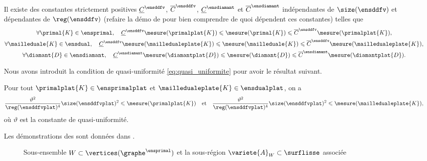 \begin{lemme} \label{prop:estimations_tailles_plat_vs_courbe}
Il existe des constantes strictement positives $\underline{C}^\ensddfv$, $\overline{C}^\ensddfv$, $\underline{C}^\ensdiamant$ et $\overline{C}^\ensdiamant$ indépendantes de $\size(\ensddfv)$ et dépendantes de $\reg(\ensddfv)$ (refaire la démo de \cite{dziuk_finite_2013} pour bien comprendre de quoi dépendent ces constantes) telles que
\begin{gather}
\forall \primal{K} \in \ensprimal,
\quad
\underline{C}^\ensddfv \mesure(\primalplat{K}) \leqslant \mesure(\primal{K}) \leqslant \overline{C}^\ensddfv \mesure(\primalplat{K}), \label{eq:estimations_tailles_plat_vs_courbe_primal} \\
\forall \mailleduale{K} \in \ensdual,
\quad
\underline{C}^\ensddfv \mesure(\mailledualeplate{K}) \leqslant \mesure(\mailleduale{K}) \leqslant \overline{C}^\ensddfv \mesure(\mailledualeplate{K}), \\
\forall \diamant{D} \in \ensdiamant,
\quad
\underline{C}^\ensdiamant \mesure(\diamantplat{D}) \leqslant \mesure(\diamant{D}) \leqslant \overline{C}^\ensdiamant \mesure(\diamantplat{D}).
\end{gather}
\end{lemme}
Nous avons introduit la condition de quasi-uniformité \ref{eq:quasi_uniformite} pour avoir le résultat suivant. 
\begin{lemme} \label{prop:mino_mesure_primal_K}
Pour tout $\primalplat{K} \in \ensprimalplat$ et $\mailledualeplate{K} \in \ensdualplat$, on a
\[
\frac{\vartheta^2}{\reg(\ensddfvplat)^4} \size(\ensddfvplat)^2 \leqslant \mesure(\primalplat{K})
\quad
\text{et}
\quad
\frac{\vartheta^2}{\reg(\ensddfvplat)^4} \size(\ensddfvplat)^2 \leqslant \mesure(\mailledualeplate{K}),
\]
où $\vartheta$ est la constante de quasi-uniformité.
\end{lemme}

\noindent Les démonstrations des  sont données dans .

\begin{figure}[H]
    \centering
    
    \caption{Sous-ensemble $W \subset \vertices(\graphe^\ensprimal)$ et la sous-région $\variete{A}_W \subset \surflisse$ associée }
\end{figure}

